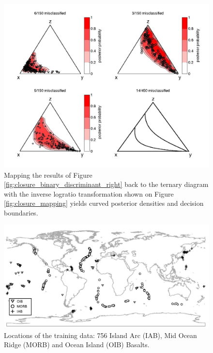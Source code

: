 \begin{figure}[htbp]
  \centering
  \includegraphics[width=600]{figures/closure_ternary_discriminant_right.jpg}
  \caption[Results of the linear discriminant analysis mapped back to the simplex]{
Mapping the  results of Figure \ref{fig:closure_binary_discriminant_right} 
back  to the ternary  diagram with  the  inverse logratio  transformation shown  on
Figure \ref{fig:closure_mapping} yields curved posterior densities and
decision boundaries.}
  \label{fig:closure_ternary_discriminant_right}
\end{figure}

\begin{figure}[htbp]
  \centering
  \includegraphics[width=600]{figures/sample_locations.jpg}
  \caption[Geographical locations of the training data]{
Locations of the training data:  756 Island Arc (IAB), Mid Ocean Ridge
(MORB) and Ocean Island (OIB) Basalts.}
  \label{fig:sample_locations}
\end{figure}

